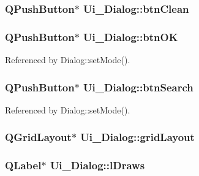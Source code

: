 \subsubsection[{btn\+Clean}]{\setlength{\rightskip}{0pt plus 5cm}Q\+Push\+Button$\ast$ Ui\+\_\+\+Dialog\+::btn\+Clean}\label{class_ui___dialog_adcea696e7dfb639f1b3e15cc828832aa}
\hypertarget{class_ui___dialog_a5f133d5ef9206bb1d4dfd8f8c82a8163}{}
\subsubsection[{btn\+O\+K}]{\setlength{\rightskip}{0pt plus 5cm}Q\+Push\+Button$\ast$ Ui\+\_\+\+Dialog\+::btn\+O\+K}\label{class_ui___dialog_a5f133d5ef9206bb1d4dfd8f8c82a8163}


Referenced by Dialog\+::set\+Mode().

\hypertarget{class_ui___dialog_a935d4a9c4699e920003ea53ab33b2c4d}{}
\subsubsection[{btn\+Search}]{\setlength{\rightskip}{0pt plus 5cm}Q\+Push\+Button$\ast$ Ui\+\_\+\+Dialog\+::btn\+Search}\label{class_ui___dialog_a935d4a9c4699e920003ea53ab33b2c4d}


Referenced by Dialog\+::set\+Mode().

\hypertarget{class_ui___dialog_a41336d41594e8776a81d095e8e4ffc61}{}
\subsubsection[{grid\+Layout}]{\setlength{\rightskip}{0pt plus 5cm}Q\+Grid\+Layout$\ast$ Ui\+\_\+\+Dialog\+::grid\+Layout}\label{class_ui___dialog_a41336d41594e8776a81d095e8e4ffc61}
\hypertarget{class_ui___dialog_a7bd37147765f438a8c23dbc8e7b0fd3a}{}
\subsubsection[{l\+Draws}]{\setlength{\rightskip}{0pt plus 5cm}Q\+Label$\ast$ Ui\+\_\+\+Dialog\+::l\+Draws}\label{class_ui___dialog_a7bd37147765f438a8c23dbc8e7b0fd3a}
\hypertarget{class_ui___dialog_a884e7aabd14cfbaeb49a967e16dae6cc}{}
